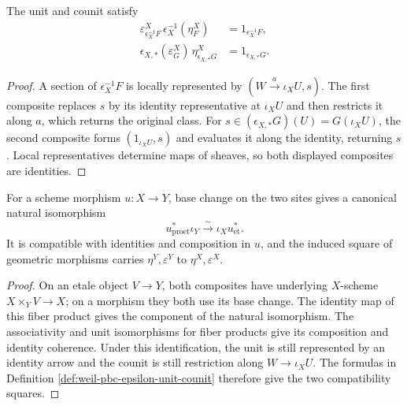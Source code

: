 \begin{lemma}
\label{lemma:weil-pbc-epsilon-triangle-identities}
The unit and counit satisfy
\begin{align*}
 \varepsilon^X_{\epsilon_X^{-1}F}\,
   \epsilon_X^{-1}(\eta^X_F)&=1_{\epsilon_X^{-1}F},\\
 \epsilon_{X,*}(\varepsilon^X_G)\,
   \eta^X_{\epsilon_{X,*}G}&=1_{\epsilon_{X,*}G}.
\end{align*}
\end{lemma}
\begin{proof}

A section of $\epsilon_X^{-1}F$ is locally represented by
$(W\xrightarrow{a}\iota_XU,s)$.  The first composite replaces $s$ by its
identity representative at $\iota_XU$ and then restricts it along $a$, which
returns the original class.  For $s\in(\epsilon_{X,*}G)(U)=G(\iota_XU)$,
the second composite forms $(1_{\iota_XU},s)$ and evaluates it along the
identity, returning $s$.  Local representatives determine maps of sheaves,
so both displayed composites are identities.
\end{proof}

\begin{lemma}
\label{lemma:weil-pbc-epsilon-scheme-naturality}
For a scheme morphism $u:X\to Y$, base change on the two sites gives a
canonical natural isomorphism
\[
 u_{\mathrm{proet}}^*\iota_Y\xrightarrow{\sim}
 \iota_Xu_{\mathrm{et}}^*.
\]
It is compatible with identities and composition in $u$, and the induced
square of geometric morphisms carries $\eta^Y,\varepsilon^Y$ to
$\eta^X,\varepsilon^X$.
\end{lemma}
\begin{proof}
On an etale object $V\to Y$, both composites have underlying $X$-scheme
$X\times_YV\to X$; on a morphism they both use its base change.  The identity
map of this fiber product gives the component of the natural isomorphism.
The associativity and unit isomorphisms for fiber products give its
composition and identity coherence.  Under this identification, the unit is
still represented by an identity arrow and the counit is still restriction
along $W\to\iota_XU$.  The formulas in Definition
\ref{def:weil-pbc-epsilon-unit-counit} therefore give the two compatibility
squares.
\end{proof}

